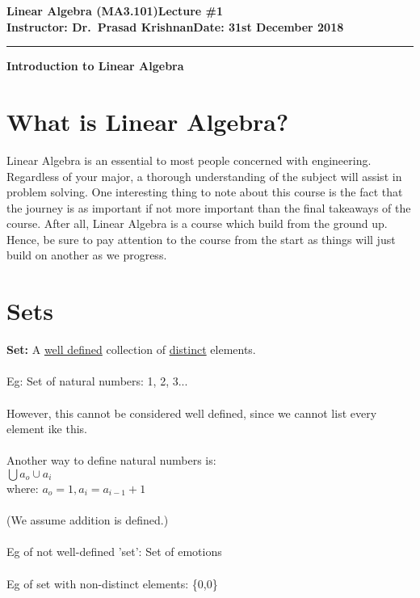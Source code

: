 \documentclass[12pt]{article}
\theoremstyle{definition}
\theoremstyle{plain}
\newcommand{\assignment}{Lecture \#1}
\newcommand{\duedate}{Date: 31st December 2018}
\begin{document}
\textbf{Linear Algebra (MA3.101)}\hfill\textbf{\assignment}\\[0.01in]
\textbf{Instructor: Dr.\ Prasad Krishnan}\hfill\textbf{\duedate}\\
\smallskip\hrule\bigskip

\begin{center}
    \LARGE
    \textbf{Introduction to Linear Algebra}
    \bigskip
\end{center}

\section{What is Linear Algebra?}
Linear Algebra is an essential to most people concerned with engineering. Regardless of your major, a thorough understanding of the subject will assist in problem solving. One interesting thing to note about this course is the fact that the journey is as important if not more important than the final takeaways of the course. After all, Linear Algebra is a course which build from the ground up. Hence, be sure to pay attention to the course from the start as things will just build on another as we progress.


\section{Sets}
\textbf{Set:} A \underline{well defined} collection of \underline{ distinct} elements.
\\\\Eg: Set of natural numbers: {1, 2, 3...}
\\\\However, this cannot be considered well defined, since we cannot list every element ike this.
\\\\Another way to define natural numbers is: 
\\$ \bigcup {a_o} \cup {a_i}$
\\where: $a_o=1, a_i=a_{i-1}+1$
\\\\(We assume addition is defined.)
\\\\Eg of not well-defined 'set': Set of emotions
\\\\Eg of set with non-distinct elements: \{0,0\}
\end{document}
